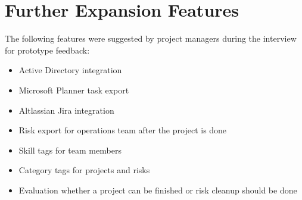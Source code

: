 \section{Further Expansion Features}
\label{appfeatures}
The following features were suggested by project managers during the interview for prototype feedback:
\begin{itemize}
	\item Active Directory integration
	\item Microsoft Planner task export
	\item Altlassian Jira integration
	\item Risk export for operations team after the project is done
	\item Skill tags for team members
	\item Category tags for projects and risks
	\item Evaluation whether a project can be finished or risk cleanup should be done
\end{itemize}
